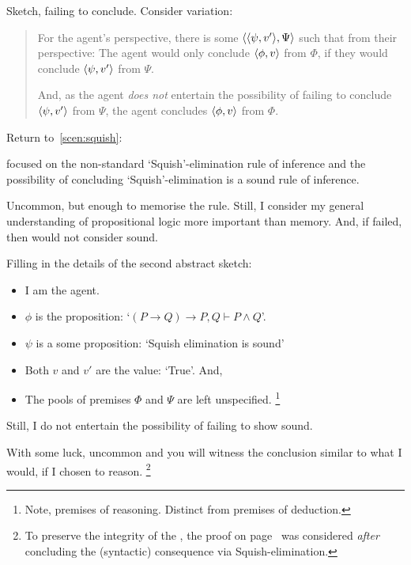 \begin{note}
  Sketch, failing to conclude.
  Consider variation:
  \begin{quote}
    For the agent's perspective, there is some \(\langle \langle \psi, v' \rangle, \Psi \rangle\) such that from their perspective:
    The agent would only conclude \(\langle \phi, v \rangle\) from \(\Phi\), if they would conclude \(\langle \psi, v' \rangle\) from \(\Psi\).

    And, as the agent \emph{does not} entertain the possibility of failing to conclude \(\langle \psi, v' \rangle\) from \(\Psi\), the agent concludes \(\langle \phi, v \rangle\) from \(\Phi\).
  \end{quote}
\end{note}

\begin{note}
  Return to~\autoref{scen:squish}:

  \scenarioPLSquish*

   focused on the non-standard `Squish'-elimination rule of inference and the possibility of concluding `Squish'-elimination is a sound rule of inference.

  Uncommon, but enough to memorise the rule.
  Still, I consider my general understanding of propositional logic more important than memory.
  And, if failed, then would not consider sound.

  Filling in the details of the second abstract sketch:
  \begin{itemize}[noitemsep]
  \item
    I am the agent.
  \item
    \(\phi\) is the proposition: `\((P \rightarrow Q) \rightarrow P, Q \vdash P \land Q\)'.
  \item
    \(\psi\) is a some proposition: `Squish elimination is sound'
  \item
    Both \(v\) and \(v'\) are the value: `True'.
    And,
  \item
    The pools of premises \(\Phi\) and \(\Psi\) are left unspecified.%
    \footnote{
      Note, premises of reasoning.
      Distinct from premises of deduction.
    }
  \end{itemize}

  Still, I do not entertain the possibility of failing to show sound.

  With some luck, uncommon and you will witness the conclusion similar to what I would, if I chosen to reason.%
  \footnote{
    To preserve the integrity of the , the proof on page~\pageref{squish-elimination-proof} was considered \emph{after} concluding the (syntactic) consequence via Squish-elimination.
  }
\end{note}

